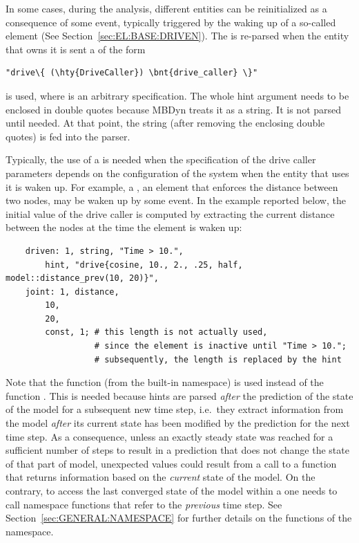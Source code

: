 In some cases, during the analysis, different entities can be reinitialized
as a consequence of some event, typically triggered by the waking up 
of a so-called  element (See Section~\ref{sec:EL:BASE:DRIVEN}).
The  is re-parsed when the entity that owns it is sent
a  of the form
\begin{Verbatim}[commandchars=\\\{\}]
    "drive\{ (\hty{DriveCaller}) \bnt{drive_caller} \}"
\end{Verbatim}
is used, where  is an arbitrary 
specification.
The whole hint argument needs to be enclosed in double quotes because MBDyn
treats it as a string.
It is not parsed until needed.
At that point, the string (after removing the enclosing double quotes)
is fed into the parser.

Typically, the use of a  is needed when the specification of the
drive caller parameters depends on the configuration of the system when the
entity that uses it is waken up.
For example, a , an element that enforces the distance
between two nodes, may be waken up by some event.
In the example reported below, the initial value of the  drive caller
is computed by extracting the current distance between the nodes at the time
the element is waken up:
\begin{verbatim}
    driven: 1, string, "Time > 10.",
        hint, "drive{cosine, 10., 2., .25, half, model::distance_prev(10, 20)}",
    joint: 1, distance,
        10,
        20,
        const, 1; # this length is not actually used,
                  # since the element is inactive until "Time > 10.";
                  # subsequently, the length is replaced by the hint
\end{verbatim}
Note that the function 
(from the built-in  namespace)
is used instead of the function .
This is needed because hints are parsed \emph{after} the prediction
of the state of the model for a subsequent new time step,
i.e.\ they extract information from the model
\emph{after} its current state has been modified by the prediction
for the next time step.
As a consequence, unless an exactly steady state was reached
for a sufficient number of steps to result in a prediction
that does not change the state of that part of model,
unexpected values could result from a call to a function that returns
information based on the \emph{current} state of the model.
On the contrary, to access the last converged state of the model
within a  one needs to call  namespace functions
that refer to the \emph{previous} time step.
See Section~\ref{sec:GENERAL:NAMESPACE} for further details
on the functions of the  namespace.



